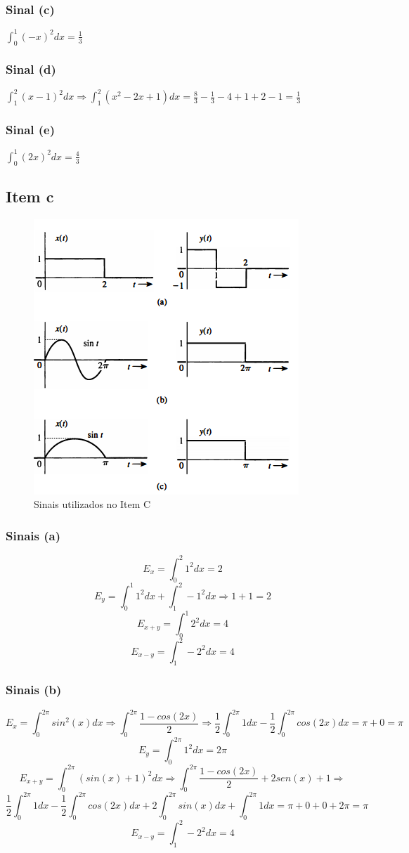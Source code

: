 \documentclass[a4paper, 12pt]{article}
\begin{document}
			\subsubsection{Sinal (c)}
			$\int_{0}^{1} (-x)^{2}dx  = \frac{1}{3}$				
			\subsubsection{Sinal (d)}
			$\int_{1}^{2} (x-1)^{2}dx  \Rightarrow \int_{1}^{2} (x^{2}-2x+1)dx = \frac{8}{3} - \frac{1}{3} - 4 +1 + 2 -1 = \frac{1}{3}$ 		
			\subsubsection{Sinal (e)}
			$\int_{0}^{1} (2x)^{2}dx  = \frac{4}{3}$ 					
		\subsection{Item c}	
			\begin{figure}[!ht]
				\centering
				\includegraphics{img/Figura3.png}
				\caption{Sinais utilizados no Item C}	
			\end{figure}		
			\subsubsection{Sinais (a)}
			\[E_{x} = \int_{0}^{2} 1^{2}dx = 2 \]
			\[E_{y} = \int_{0}^{1} 1^{2}dx + \int_{1}^{2} -1^{2}dx \Rightarrow 1 + 1 = 2 \]
			\[E_{x+y} = \int_{0}^{1} 2^{2}dx = 4 \]
			\[E_{x-y} = \int_{1}^{2} -2^{2}dx = 4 \]	
			\subsubsection{Sinais (b)}
			\[E_{x} = \int_{0}^{2\pi} sin^{2}(x)dx \Rightarrow \int_{0}^{2\pi} \frac{1-cos(2x)}{2} \Rightarrow  \frac{1}{2}\int_{0}^{2\pi} 1dx - \frac{1}{2}\int_{0}^{2\pi} cos(2x)dx = \pi + 0 = \pi\]
			\[E_{y} = \int_{0}^{2\pi} 1^{2}dx  = 2\pi \]
			\[E_{x+y} = \int_{0}^{2\pi} (sin(x) +1)^{2}dx \Rightarrow \int_{0}^{2\pi} \frac{1-cos(2x)}{2} + 2sen(x) + 1\Rightarrow\]\[ \frac{1}{2}\int_{0}^{2\pi} 1dx - \frac{1}{2}\int_{0}^{2\pi} cos(2x)dx + 2\int_{0}^{2\pi} sin(x)dx + \int_{0}^{2\pi} 1dx= \pi + 0 + 0 + 2\pi = \pi\]
			\[E_{x-y} = \int_{1}^{2} -2^{2}dx = 4 \]							
\end{document}
